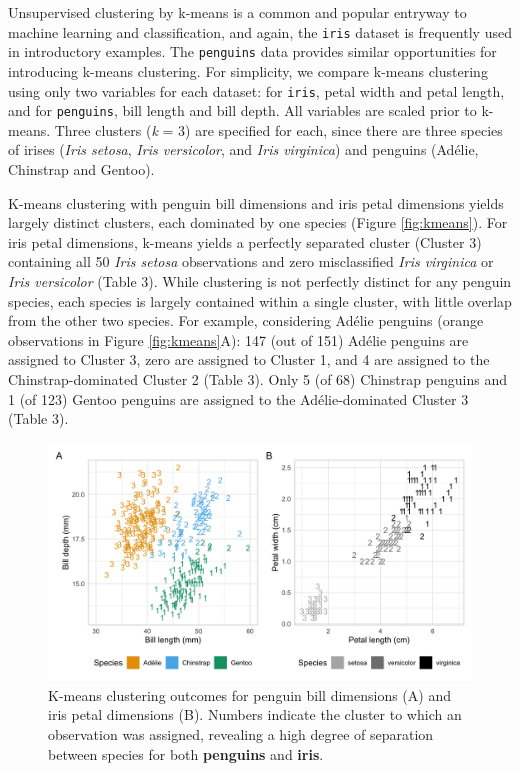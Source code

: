 Unsupervised clustering by k-means is a common and popular entryway to
machine learning and classification, and again, the \texttt{iris}
dataset is frequently used in introductory examples. The
\texttt{penguins} data provides similar opportunities for introducing
k-means clustering. For simplicity, we compare k-means clustering using
only two variables for each dataset: for \texttt{iris}, petal width and
petal length, and for \texttt{penguins}, bill length and bill depth. All
variables are scaled prior to k-means. Three clusters (\emph{k} = 3) are
specified for each, since there are three species of irises (\emph{Iris
setosa}, \emph{Iris versicolor}, and \emph{Iris virginica}) and penguins
(Adélie, Chinstrap and Gentoo).

K-means clustering with penguin bill dimensions and iris petal
dimensions yields largely distinct clusters, each dominated by one
species (Figure \ref{fig:kmeans}). For iris petal dimensions, k-means
yields a perfectly separated cluster (Cluster 3) containing all 50
\emph{Iris setosa} observations and zero misclassified \emph{Iris
virginica} or \emph{Iris versicolor} (Table 3). While clustering is not
perfectly distinct for any penguin species, each species is largely
contained within a single cluster, with little overlap from the other
two species. For example, considering Adélie penguins (orange
observations in Figure \ref{fig:kmeans}A): 147 (out of 151) Adélie
penguins are assigned to Cluster 3, zero are assigned to Cluster 1, and
4 are assigned to the Chinstrap-dominated Cluster 2 (Table 3). Only 5
(of 68) Chinstrap penguins and 1 (of 123) Gentoo penguins are assigned
to the Adélie-dominated Cluster 3 (Table 3).

\begin{Schunk}
\begin{figure}[htbp]

{\centering \includegraphics{figs/kmeans-plots-1} 

}

\caption[K-means clustering outcomes for penguin bill dimensions (A) and iris petal dimensions (B)]{K-means clustering outcomes for penguin bill dimensions (A) and iris petal dimensions (B). Numbers indicate the cluster to which an observation was assigned, revealing a high degree of separation between species for both \textbf{penguins} and \textbf{iris}.}\label{fig:kmeans-plots}
\end{figure}
\end{Schunk}

